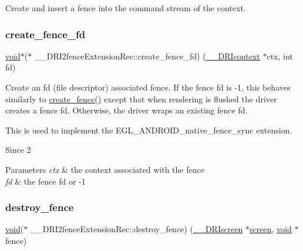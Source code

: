 Create and insert a fence into the command stream of the context. \mbox{\label{struct_____d_r_i2fence_extension_rec_af5d2a292e552237d4a4378807002013b}} 
\subsubsection{\texorpdfstring{create\+\_\+fence\+\_\+fd}{create\_fence\_fd}}
{\footnotesize\ttfamily \hyperlink{_s_d_l__opengles2__gl2ext_8h_ae5d8fa23ad07c48bb609509eae494c95}{void}$\ast$($\ast$ \+\_\+\+\_\+\+D\+R\+I2fence\+Extension\+Rec\+::create\+\_\+fence\+\_\+fd) (\hyperlink{dri__interface_8h_a3fd295cba82b5a3d79f1ee7e12bfb908}{\+\_\+\+\_\+\+D\+R\+Icontext} $\ast$ctx, int fd)}

Create an fd (file descriptor) associated fence. If the fence fd is -\/1, this behaves similarly to \hyperlink{struct_____d_r_i2fence_extension_rec_ad75a0042594520674e333b2105f72e91}{create\+\_\+fence()} except that when rendering is flushed the driver creates a fence fd. Otherwise, the driver wraps an existing fence fd.

This is used to implement the E\+G\+L\+\_\+\+A\+N\+D\+R\+O\+I\+D\+\_\+native\+\_\+fence\+\_\+sync extension.

\begin{DoxySince}{Since}
2
\end{DoxySince}

\begin{DoxyParams}{Parameters}
{\em ctx} & the context associated with the fence \\
\hline
{\em fd} & the fence fd or -\/1 \\
\hline
\end{DoxyParams}
\mbox{\label{struct_____d_r_i2fence_extension_rec_a482020bd8edb9b4d4851d3ac40336da6}} 
\subsubsection{\texorpdfstring{destroy\+\_\+fence}{destroy\_fence}}
{\footnotesize\ttfamily \hyperlink{_s_d_l__opengles2__gl2ext_8h_ae5d8fa23ad07c48bb609509eae494c95}{void}($\ast$ \+\_\+\+\_\+\+D\+R\+I2fence\+Extension\+Rec\+::destroy\+\_\+fence) (\hyperlink{dri__interface_8h_a9961b01d421ee1fd6ed3c05acc9ca561}{\+\_\+\+\_\+\+D\+R\+Iscreen} $\ast$\hyperlink{cad_8h_ae04e09e4e3831bfc1632c509ae37dcec}{screen}, \hyperlink{_s_d_l__opengles2__gl2ext_8h_ae5d8fa23ad07c48bb609509eae494c95}{void} $\ast$fence)}

